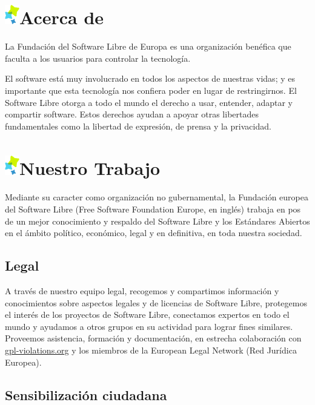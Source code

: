 \documentclass[10pt,foldmark,tumble]{leaflet}
\begin{document}
\section{\includegraphics{item.png}Acerca de}

La Fundación del Software Libre de Europa es una organización benéfica que faculta a los usuarios para controlar la tecnología.

El software está muy involucrado en todos los aspectos de nuestras vidas; y es importante que esta tecnología nos confiera poder en lugar de restringirnos. El Software Libre otorga a todo el mundo el derecho a usar, entender, adaptar y compartir software. Estos derechos ayudan a apoyar otras libertades fundamentales como la libertad de expresión, de prensa y la privacidad.

\section{\includegraphics{item.png}Nuestro Trabajo}

 Mediante su caracter como organización no gubernamental, la Fundación europea del Software Libre (Free Software Foundation Europe, en inglés) trabaja en pos de un mejor conocimiento y respaldo del Software Libre y los Estándares Abiertos en el ámbito político, económico, legal y en definitiva, en toda nuestra sociedad.

 \subsection{Legal}

    A través de nuestro equipo legal, recogemos y compartimos información y conocimientos sobre aspectos legales y de licencias de Software Libre, protegemos el interés de los proyectos de Software Libre, conectamos expertos en todo el mundo y ayudamos a otros grupos en su actividad para lograr fines similares. Proveemos asistencia, formación y documentación, en estrecha colaboración con \url{gpl-violations.org} y los miembros de la European Legal Network (Red Jurídica Europea).
        
\subsection{Sensibilización ciudadana}
\end{document}
